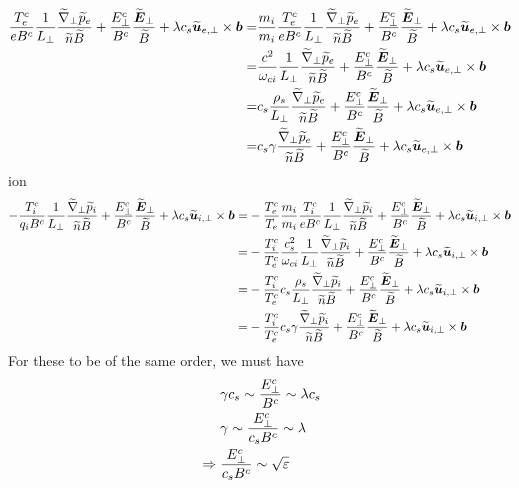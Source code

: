 \begin{align*}
    \frac{T^c_e}{e B^c}
\frac{1}{L_{\perp}}
\frac{ \widetilde{ \nabla}_\perp \widetilde{ p}_e }{\widetilde{ n} \widetilde{ B}}
+ \frac{E_\perp^c}{B^c}
\frac{\widetilde{ \boldsymbol{E}}_\perp}{\widetilde{ B}}
+ \lambda c_s
\widetilde{ \boldsymbol{u}}_{e,\perp}\times\boldsymbol{b}
=&
\frac{m_i}{m_i}
\frac{T^c_e}{e B^c}
\frac{1}{L_{\perp}}
\frac{ \widetilde{ \nabla}_\perp \widetilde{ p}_e }{\widetilde{ n} \widetilde{ B}}
+ \frac{E_\perp^c}{B^c}
\frac{\widetilde{ \boldsymbol{E}}_\perp}{\widetilde{ B}}
+ \lambda c_s
\widetilde{ \boldsymbol{u}}_{e,\perp}\times\boldsymbol{b}
\\
=&
\frac{c^2}{\omega_{ci}}
\frac{1}{L_{\perp}}
\frac{ \widetilde{ \nabla}_\perp \widetilde{ p}_e }{\widetilde{ n} \widetilde{ B}}
+ \frac{E_\perp^c}{B^c}
\frac{\widetilde{ \boldsymbol{E}}_\perp}{\widetilde{ B}}
+ \lambda c_s
\widetilde{ \boldsymbol{u}}_{e,\perp}\times\boldsymbol{b}
\\
=&
c_s
\frac{\rho_s}{L_{\perp}}
\frac{ \widetilde{ \nabla}_\perp \widetilde{ p}_e }{\widetilde{ n} \widetilde{ B}}
+ \frac{E_\perp^c}{B^c}
\frac{\widetilde{ \boldsymbol{E}}_\perp}{\widetilde{ B}}
+ \lambda c_s
\widetilde{ \boldsymbol{u}}_{e,\perp}\times\boldsymbol{b}
\\
=&
c_s
\gamma
\frac{ \widetilde{ \nabla}_\perp \widetilde{ p}_e }{\widetilde{ n} \widetilde{ B}}
+ \frac{E_\perp^c}{B^c}
\frac{\widetilde{ \boldsymbol{E}}_\perp}{\widetilde{ B}}
+ \lambda c_s
\widetilde{ \boldsymbol{u}}_{e,\perp}\times\boldsymbol{b}
\end{align*}
%
ion
%
\begin{align*}
    - \frac{T^c_i}{q_i B^c}
\frac{1}{L_{\perp}}
\frac{ \widetilde{ \nabla}_\perp \widetilde{ p}_i }{\widetilde{ n} \widetilde{ B}}
+ \frac{E_\perp^c}{B^c}
\frac{\widetilde{ \boldsymbol{E}}_\perp}{\widetilde{ B}}
+ \lambda c_s
\widetilde{ \boldsymbol{u}}_{i,\perp}\times\boldsymbol{b}
=&
- \frac{T_e^c}{T_e}
\frac{m_i}{m_i}
\frac{T^c_i}{e B^c}
\frac{1}{L_{\perp}}
\frac{ \widetilde{ \nabla}_\perp \widetilde{ p}_i }{\widetilde{ n} \widetilde{ B}}
+ \frac{E_\perp^c}{B^c}
\frac{\widetilde{ \boldsymbol{E}}_\perp}{\widetilde{ B}}
+ \lambda c_s
\widetilde{ \boldsymbol{u}}_{i,\perp}\times\boldsymbol{b}
\\
=&
- \frac{T^c_i}{T_e^c}
\frac{c_s^2}{\omega_{ci}}
\frac{1}{L_{\perp}}
\frac{ \widetilde{ \nabla}_\perp \widetilde{ p}_i }{\widetilde{ n} \widetilde{ B}}
+ \frac{E_\perp^c}{B^c}
\frac{\widetilde{ \boldsymbol{E}}_\perp}{\widetilde{ B}}
+ \lambda c_s
\widetilde{ \boldsymbol{u}}_{i,\perp}\times\boldsymbol{b}
\\
=&
- \frac{T^c_i}{T_e^c}
c_s
\frac{\rho_s}{L_{\perp}}
\frac{ \widetilde{ \nabla}_\perp \widetilde{ p}_i }{\widetilde{ n} \widetilde{ B}}
+ \frac{E_\perp^c}{B^c}
\frac{\widetilde{ \boldsymbol{E}}_\perp}{\widetilde{ B}}
+ \lambda c_s
\widetilde{ \boldsymbol{u}}_{i,\perp}\times\boldsymbol{b}
\\
=&
- \frac{T^c_i}{T_e^c}
c_s
\gamma
\frac{ \widetilde{ \nabla}_\perp \widetilde{ p}_i }{\widetilde{ n} \widetilde{ B}}
+ \frac{E_\perp^c}{B^c}
\frac{\widetilde{ \boldsymbol{E}}_\perp}{\widetilde{ B}}
+ \lambda c_s
\widetilde{ \boldsymbol{u}}_{i,\perp}\times\boldsymbol{b}
\end{align*}
%
For these to be of the same order, we must have
%
\begin{align*}
    &\gamma c_s \sim \frac{E_\perp^c}{B^c} \sim \lambda c_s \\
    &\gamma \sim \frac{E_\perp^c}{c_sB^c} \sim \lambda  \\
    \; \Rightarrow \;& \frac{E_\perp^c}{c_sB^c} \sim \sqrt{\varepsilon}
\end{align*}
